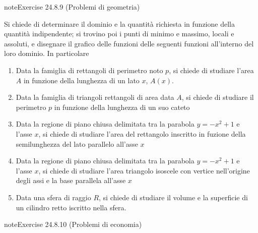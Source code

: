 \documentclass[letterpaper,10pt,italian]{jupyterBook}
\begin{document}
\begin{sphinxadmonition}{note}{Exercise 24.8.9 (Problemi di geometria)}



\sphinxAtStartPar
Si chiede di determinare il dominio e la quantità richiesta in funzione della quantità indipendente; si trovino poi i punti di minimo e massimo, locali e assoluti, e disegnare il grafico delle funzioni delle seguenti funzioni all’interno del loro dominio. In particolare
\begin{enumerate}
%
\item {} 
\sphinxAtStartPar
Data la famiglia di rettangoli di perimetro noto \(p\), si chiede di studiare l’area \(A\) in funzione della lunghezza di un lato \(x\), \(A(x)\).

\item {} 
\sphinxAtStartPar
Data la famiglia di triangoli rettangoli di area data \(A\), si chiede di studiare il perimetro \(p\) in funzione della lunghezza di un suo cateto

\item {} 
\sphinxAtStartPar
Data la regione di piano chiusa delimitata tra la parabola \(y = -x^2+1\) e l’asse \(x\), si chiede di studiare l’area del rettangolo inscritto in fuzione della semi\sphinxhyphen{}lunghezza del lato parallelo all’asse \(x\)

\item {} 
\sphinxAtStartPar
Data la regione di piano chiusa delimitata tra la parabola \(y = -x^2+1\) e l’asse \(x\), si chiede di studiare l’area triangolo isoscele con vertice nell’origine degli assi e la base parallela all’asse \(x\)

\item {} 
\sphinxAtStartPar
Data una sfera di raggio \(R\), si chiede di studiare il volume e la superficie di un cilindro retto iscritto nella sfera.

\end{enumerate}
\end{sphinxadmonition}
 \label{exercise:ch/infinitesimal_calculus/derivatives-problems-exercise-9}

\begin{sphinxadmonition}{note}{Exercise 24.8.10 (Problemi di economia)}



\sphinxAtStartPar
{}
\end{sphinxadmonition}
\end{document}
